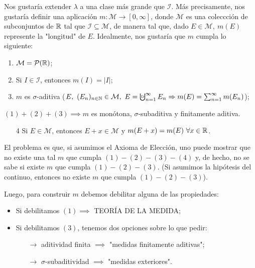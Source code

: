 
Nos gustaría extender $\lambda$ a una clase más grande que $\mathcal{I}$. Más precisamente, nos gustaría definir una aplicación $m : \mathcal{M} \to [0,\infty]$, donde $\mathcal{M}$ es una coleccción de subconjuntos de $\mathbb{R}$ tal que $\mathcal{I} \subseteq \mathcal{M}$, de manera tal que, dado $E \in \mathcal{M},\ m(E)$ represente la "longitud" de $E$. Idealmente, nos gustaría que $m$ cumpla lo siguiente:
\begin{enumerate}
	\item $\mathcal{M} = \mathcal{P}(\mathbb{R})$;

	\item Si $I \in \mathcal{I}$, entonces $m(I) = |I|$;

	\item $m$ es $\sigma$-aditiva ($E,\ (E_n)_{n\in\N}\in \mathcal{M},\ E = \textbigcupd_{n=1}^{\infty} E_n \implies m(E) = \sum_{n=1}^{\infty} m(E_n)$);
\end{enumerate}
\begin{ex}
	$(1)+(2)+(3) \implies m$ es monótona, $\sigma$-subaditiva y finitamente aditiva. 
\end{ex}
\begin{enumerate}
	\item[4] Si $E \in \mathcal{M}$, entonces $E + x \in \mathcal{M}$ y $m(E + x) = m(E)\ \forall x \in \mathbb{R}$.
\end{enumerate}
\noindent El problema es que, si asumimos el Axioma de Elección, uno puede mostrar que no existe una tal $m$ que cumpla $(1)-(2)-(3)-(4)$ y, de hecho, no se sabe si existe $m$ que cumpla $(1)-(2)-(3)$. (Si asumimos la hipótesis del continuo, entonces no existe $m$ que cumpla $(1)-(2)-(3)$). \par
\medskip
\noindent Luego, para construir $m$ debemos debilitar alguna de las propiedades:
\begin{itemize}
	\item Si debilitamos $(1) \implies$ TEORÍA DE LA MEDIDA;
	
	\item Si debilitamos $(3)$, tenemos dos opciones sobre lo que pedir:
	\begin{itemize}
		\item[$\rightarrow$] aditividad finita $ \implies$ "medidas finitamente aditivas";
	
		\item[$\rightarrow$] $\sigma$-subaditividad $\implies$ "medidas exteriores".
	\end{itemize}
\end{itemize}

